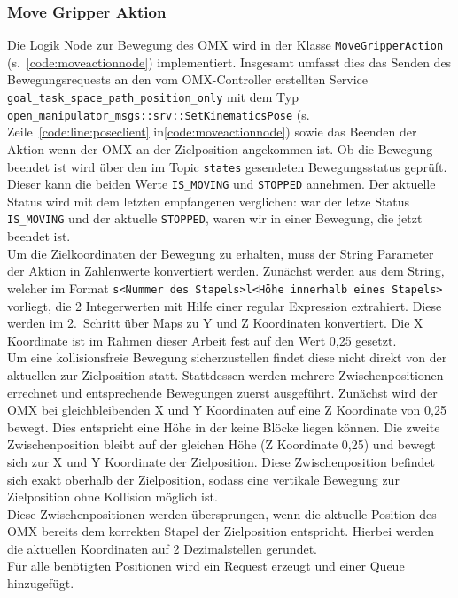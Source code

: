 \subsubsection{Move Gripper Aktion}
Die Logik Node zur Bewegung des OMX wird in der Klasse \verb|MoveGripperAction| (s.~\ref{code:moveactionnode}) implementiert.
Insgesamt umfasst dies das Senden des Bewegungsrequests an den vom OMX-Controller erstellten Service \verb|goal_task_space_path_position_only| mit dem Typ \verb|open_manipulator_msgs::srv::SetKinematicsPose| (s. Zeile~\ref{code:line:poseclient} in\ref{code:moveactionnode}) sowie das Beenden der Aktion wenn der OMX an der Zielposition angekommen ist.
Ob die Bewegung beendet ist wird über den im Topic \verb|states| gesendeten Bewegungsstatus geprüft.
Dieser kann die beiden Werte \verb|IS_MOVING| und \verb|STOPPED| annehmen.
Der aktuelle Status wird mit dem letzten empfangenen verglichen: war der letze Status \verb|IS_MOVING| und der aktuelle \verb|STOPPED|, waren wir in einer Bewegung, die jetzt beendet ist.\\
Um die Zielkoordinaten der Bewegung zu erhalten, muss der String Parameter der Aktion in Zahlenwerte konvertiert werden.
Zunächst werden aus dem String, welcher im Format \verb|s<Nummer des Stapels>l<Höhe innerhalb eines Stapels>| vorliegt, die 2 Integerwerten mit Hilfe einer regular Expression extrahiert.
Diese werden im 2.\ Schritt über Maps zu Y und Z Koordinaten konvertiert.
Die X Koordinate ist im Rahmen dieser Arbeit fest auf den Wert 0,25 gesetzt.\\
Um eine kollisionsfreie Bewegung sicherzustellen findet diese nicht direkt von der aktuellen zur Zielposition statt.
Stattdessen werden mehrere Zwischenpositionen errechnet und entsprechende Bewegungen zuerst ausgeführt.
Zunächst wird der OMX bei gleichbleibenden X und Y Koordinaten auf eine Z Koordinate von 0,25 bewegt.
Dies entspricht eine Höhe in der keine Blöcke liegen können.
Die zweite Zwischenposition bleibt auf der gleichen Höhe (Z Koordinate 0,25) und bewegt sich zur X und Y Koordinate der Zielposition.
Diese Zwischenposition befindet sich exakt oberhalb der Zielposition, sodass eine vertikale Bewegung zur Zielposition ohne Kollision möglich ist.\\
Diese Zwischenpositionen werden übersprungen, wenn die aktuelle Position des OMX bereits dem korrekten Stapel der Zielposition entspricht.
Hierbei werden die aktuellen Koordinaten auf 2 Dezimalstellen gerundet.\\
Für alle benötigten Positionen wird ein Request erzeugt und einer Queue hinzugefügt.
